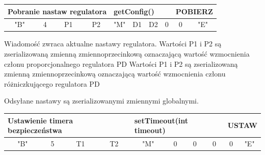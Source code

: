\documentclass[eng,printmode]{mgr}
\begin{document}
\begin{table}[!htb]
\centering
\begin{adjustbox}{width=1\textwidth}
\label{my-label}
\begin{tabular}{|c|c|c|c|c|c|c|c|c|c|}
\hline
\multicolumn{4}{|l|}{Pobranie nastaw regulatora  } & \multicolumn{4}{l|}{getConfig()} & \multicolumn{2}{l|}{POBIERZ} \\ \hline
"B" \hspace{1em}             & 4\hspace{2em}              & P1\hspace{2em}              & P2\hspace{2em}         & "M"\hspace{2em}         & D1\hspace{2em}         & D2\hspace{2em}         & 0\hspace{2em}         & 0\hspace{2em}          & "E"\hspace{2em}          \\ \hline
\end{tabular}
\end{adjustbox}
\end{table}
 Wiadomość zwraca aktualne nastawy regulatora. 
Wartości P1 i P2 są zserializowaną zmienną zmiennoprzecinkową oznaczającą wartość wzmocnienia członu proporcjonalnego regulatora PD
Wartości P1 i P2 są zserializowaną zmienną zmiennoprzecinkową oznaczającą wartość wzmocnienia członu różniczkującego regulatora PD

Odsyłane nastawy  są zserializowanymi zmiennymi globalnymi.


\begin{table}[!htb]
\centering
\begin{adjustbox}{width=1\textwidth}
\label{my-label}
\begin{tabular}{|c|c|c|c|c|c|c|c|c|c|}
\hline
\multicolumn{4}{|l|}{Ustawienie timera bezpieczeństwa } & \multicolumn{4}{l|}{setTimeout(int timeout)} & \multicolumn{2}{l|}{USTAW} \\ \hline
"B" \hspace{1em}             & 5\hspace{2em}              & T1\hspace{2em}              & T2\hspace{2em}         & "M"\hspace{2em}         & 0\hspace{2em}         & 0\hspace{2em}         & 0\hspace{2em}         & 0\hspace{2em}          & "E"\hspace{2em}          \\ \hline
\end{tabular}
\end{adjustbox}
\end{table}
\end{document}
